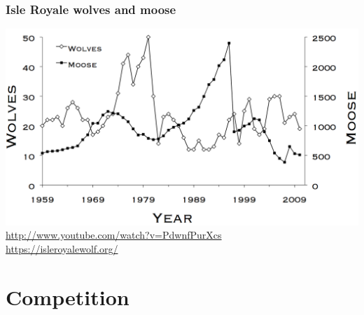 \documentclass[color=usenames,dvipsnames]{beamer}\usepackage[]{graphicx}\usepackage[]{color}
\begin{document}
\begin{frame}
  \frametitle{Isle Royale wolves and moose}
  \centering
  \includegraphics[width=1\textwidth]{figs/Fig01_wolfmoosechronology} \\
  \vfill
  \url{
    http://www.youtube.com/watch?v=PdwnfPurXcs
  } \\
  \url{
    https://isleroyalewolf.org/
  }
\end{frame}



\section{Competition}
\end{document}
